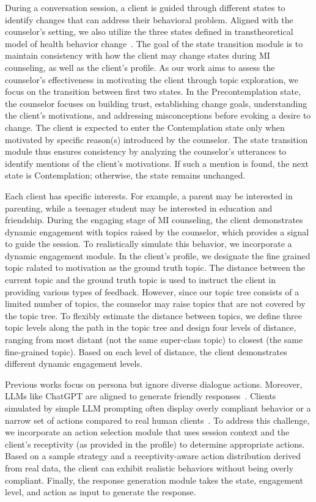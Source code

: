 During a conversation session, a client is guided through different states to identify changes that can address their behavioral problem. Aligned with the counselor's setting, we also utilize the three states defined in transtheoretical model of health behavior change~\citep{prochaska2005transtheoretical,prochaska2008initial}. The goal of the state transition module is to maintain consistency with how the client may change states during MI counseling, as well as the client's profile. As our work aims to assess the counselor's effectiveness in motivating the client through topic exploration, we focus on the transition between first two states. In the Precontemplation state, the counselor focuses on building trust, establishing change goals, understanding the client's motivations, and addressing misconceptions before evoking a desire to change. The client is expected to enter the Contemplation state only when motivated by specific reason(s) introduced by the counselor. The state transition module thus ensures consistency by analyzing the counselor's utterances to identify mentions of the client's motivations. If such a mention is found, the next state is Contemplation; otherwise, the state remains unchanged.

Each client has specific interests. For example, a parent may be interested in parenting, while a teenager student may be interested in education and friendship. During the engaging stage of MI counseling, the client demonstrates dynamic engagement with topics raised by the counselor, which provides a signal to guide the session. To realistically simulate this behavior, we incorporate a dynamic engagement module. In the client's profile, we designate the fine grained topic ralated to motivation as the ground truth topic. The distance between the current topic and the ground truth topic is used to instruct the client in providing various types of feedback. However, since our topic tree consists of a limited number of topics, the counselor may raise topics that are not covered by the topic tree. To flexibly estimate the distance between topics, we define three topic levels along the path in the topic tree and design four levels of distance, ranging from most distant (not the same super-class topic) to closest (the same fine-grained topic). Based on each level of distance, the client demonstrates different dynamic engagement levels.

Previous works focus on persona but ignore diverse dialogue actions. Moreover, LLMs like ChatGPT are aligned to generate friendly responses~\citep{shen2023large,kopf2024openassistant}. Clients simulated by simple LLM prompting often display overly compliant behavior or a narrow set of actions compared to real human clients~\citep{kang2024can}. To address this challenge, we incorporate an action selection module that uses session context and the client's receptivity (as provided in the profile) to determine appropriate actions. Based on a sample strategy and a receptivity-aware action distribution derived from real data, the client can exhibit realistic behaviors without being overly compliant. Finally, the response generation module takes the state, engagement level, and action as input to generate the response.

